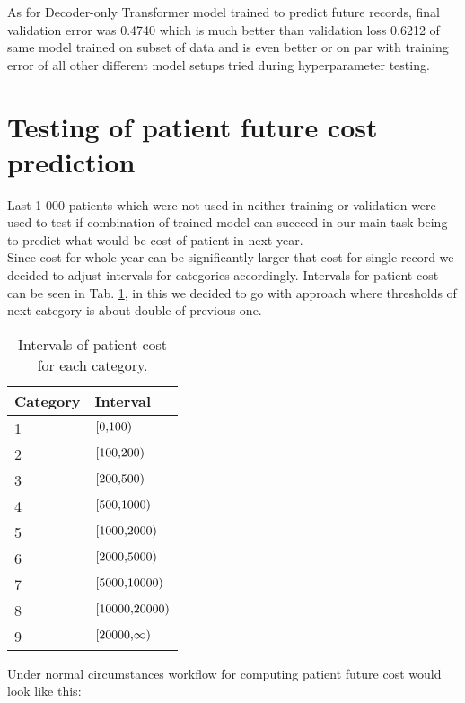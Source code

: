 As for Decoder-only Transformer model trained to predict future records, final validation error was 0.4740 which is much better than validation loss 0.6212 of same model trained on subset of data and is even better or on par with training error of all other different model setups tried during hyperparameter testing. 

\section{Testing of patient future cost prediction}
\label{pat_fut_res}

Last 1 000 patients which were not used in neither training or validation were used to test if combination of trained model can succeed in our main task being to predict what would be cost of patient in next year.
\\

Since cost for whole year can be significantly larger that cost for single record we decided to adjust intervals for categories accordingly. Intervals for patient cost can be seen in Tab. \ref{tab:patCost}, in this we decided to go with approach where thresholds of next category is about double of previous one.
\\

\begin{table}[!h]
	\centering
	\begin{tabular}{|l|l|}
		\hline
		Category  & Interval \\ \hline
		1 & $\interval[{0,100})$ \\ \hline
		2 & $\interval[{100,200})$ \\ \hline
		3 & $\interval[{200,500})$ \\ \hline
		4 & $\interval[{500,1000})$ \\ \hline
		5 & $\interval[{1000,2000})$ \\ \hline
		6 & $\interval[{2000,5000})$ \\ \hline
		7 & $\interval[{5000,10000})$ \\ \hline
		8 & $\interval[{10000,20000})$ \\ \hline
		9 & $\interval[{20000,\infty})$ \\ \hline
	\end{tabular}
	\caption{Intervals of patient cost for each category.}
	\label{tab:patCost}
\end{table}  

Under normal circumstances workflow for computing patient future cost would look like this:

